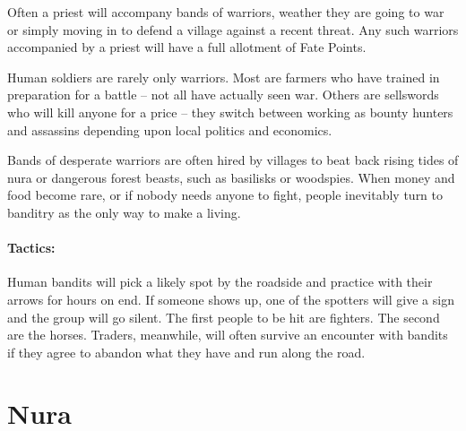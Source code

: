 \begin{multicols}{2}

Often a priest will accompany bands of warriors, weather they are going to war or simply moving in to defend a village against a recent threat.
Any such warriors accompanied by a priest will have a full allotment of Fate Points.

\label{human_soldier}

Human soldiers are rarely only warriors.
Most are farmers who have trained in preparation for a battle -- not all have actually seen war.
Others are sellswords who will kill anyone for a price -- they switch between working as bounty hunters and assassins depending upon local politics and economics.

Bands of desperate warriors are often hired by villages to beat back rising tides of nura or dangerous forest beasts, such as basilisks or woodspies.
When money and food become rare, or if nobody needs anyone to fight, people inevitably turn to banditry as the only way to make a living.

\paragraph{Tactics:} Human bandits will pick a likely spot by the roadside and practice with their arrows for hours on end.
If someone shows up, one of the spotters will give a sign and the group will go silent.
The first people to be hit are fighters.
The second are the horses.
Traders, meanwhile, will often survive an encounter with bandits if they agree to abandon what they have and run along the road.



\vfill\null
\end{multicols}

\section{Nura}


